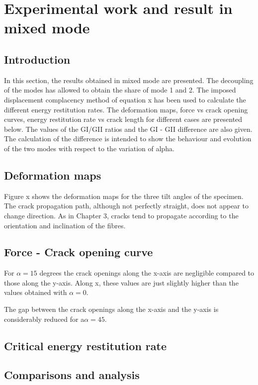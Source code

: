 \chapter{Experimental work and result in mixed mode}
\label{Chapter2}

\section{Introduction}

In this section, the results obtained in mixed mode are presented. The decoupling of the modes has allowed to obtain the share of mode 1 and 2. The imposed displacement complacency method of equation x has been used to calculate the different energy restitution rates. The deformation maps, force vs crack opening curves, energy restitution rate vs crack length for different cases are presented below. The values of the GI/GII ratios and the GI - GII difference are also given. The calculation of the difference is intended to show the behaviour and evolution of the two modes with respect to the variation of alpha.

\section{Deformation maps}

Figure x shows the deformation maps for the three tilt angles of the specimen. The crack propagation path, although not perfectly straight, does not appear to change direction. As in Chapter 3, cracks tend to propagate according to the orientation and inclination of the fibres.

\section{Force - Crack opening curve}

For $\alpha=15$ degrees the crack openings along the x-axis are negligible compared to those along the y-axis. Along x, these values are just slightly higher than the values obtained with $\alpha=0$.

The gap between the crack openings along the x-axis and the y-axis is considerably reduced for a$\alpha=45$.

\section{Critical energy restitution rate}

\section{Comparisons and analysis}

